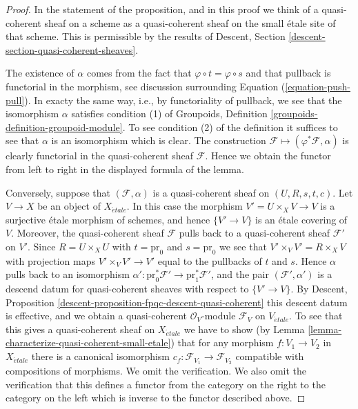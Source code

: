 \begin{proof}
In the statement of the proposition, and in this proof we think of a
quasi-coherent sheaf on a scheme as a quasi-coherent sheaf on the small
\'etale site of that scheme. This is permissible by the results of
Descent, Section \ref{descent-section-quasi-coherent-sheaves}.

\medskip\noindent
The existence of $\alpha$ comes from the fact that
$\varphi \circ t = \varphi \circ s$ and that pullback is
functorial in the morphism, see discussion surrounding
Equation (\ref{equation-push-pull}). In exacty the same way, i.e., by
functoriality of pullback, we see that the isomorphism $\alpha$ satisfies
condition (1) of
Groupoids, Definition \ref{groupoids-definition-groupoid-module}.
To see condition (2) of the definition it suffices to see that $\alpha$
is an isomorphism which is clear. The construction
$\mathcal{F} \mapsto (\varphi^*\mathcal{F}, \alpha)$
is clearly functorial in the quasi-coherent sheaf $\mathcal{F}$.
Hence we obtain the functor from left to right in the displayed
formula of the lemma.

\medskip\noindent
Conversely, suppose that $(\mathcal{F}, \alpha)$ is a quasi-coherent
sheaf on $(U, R, s, t, c)$. Let $V \to X$ be an object of $X_{\acute{e}tale}$.
In this case the morphism $V' = U \times_X V \to V$ is a surjective \'etale
morphism of schemes, and hence $\{V' \to V\}$ is an \'etale
covering of $V$. Moreover, the quasi-coherent sheaf $\mathcal{F}$
pulls back to a quasi-coherent sheaf $\mathcal{F}'$ on $V'$.
Since $R = U \times_X U$ with $t = \text{pr}_0$ and $s = \text{pr}_0$
we see that $V' \times_V V' = R \times_X V$ with projection maps
$V' \times_V V' \to V'$ equal to the pullbacks of $t$ and $s$. Hence
$\alpha$ pulls back to an isomorphism
$\alpha' : \text{pr}_0^*\mathcal{F}' \to \text{pr}_1^*\mathcal{F}'$, and
the pair $(\mathcal{F}', \alpha')$ is a descend datum for quasi-coherent
sheaves with respect to $\{V' \to V\}$. By
Descent, Proposition
\ref{descent-proposition-fpqc-descent-quasi-coherent}
this descent datum is effective, and we obtain a quasi-coherent
$\mathcal{O}_V$-module $\mathcal{F}_V$ on $V_{\acute{e}tale}$.
To see that this gives a quasi-coherent sheaf on $X_{\acute{e}tale}$ we have
to show (by
Lemma \ref{lemma-characterize-quasi-coherent-small-etale})
that for any morphism $f : V_1 \to V_2$ in $X_{\acute{e}tale}$
there is a canonical isomorphism
$c_f : \mathcal{F}_{V_1} \to \mathcal{F}_{V_2}$
compatible with compositions of morphisms. We omit the verification.
We also omit the verification that this defines a functor from the
category on the right to the category on the left which is inverse
to the functor described above.
\end{proof}








